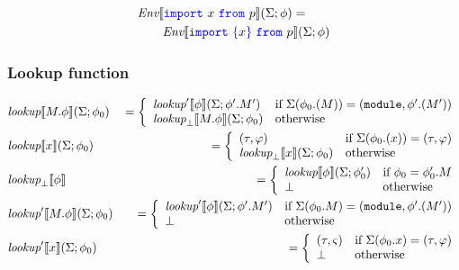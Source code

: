 \documentclass[a4paper]{article}
\newcommand{\code}[1]{\textcolor{blue}{\tt #1}}
\newcommand{\module}{{\tt{module}}}
\newcommand{\Env}{\emph{Env}}
\newcommand{\lookup}{\emph{lookup}}
\newcommand{\If}{\mbox{if}}
\newcommand{\Otherwise}{\mbox{otherwise}}
\begin{document}
\begin{equation*}
\begin{split}
&\Env \llbracket \code{import}\ x\ \code{from}\ p \rrbracket (\Sigma; \phi) = \\
&\qquad \Env \llbracket \code{import}\ \code{\{} x \code{\}}\ \code{from}\ p \rrbracket (\Sigma; \phi)
\end{split}
\end{equation*}

\subsubsection{Lookup function}

\begin{eqnarray*}
&\lookup \llbracket M.\phi \rrbracket (\Sigma; \phi_0) & = \left\{\begin{array}{ll}
\lookup' \llbracket \phi \rrbracket (\Sigma; \phi'.M') & \If\ \Sigma(\phi_0.(M)) = (\module, \phi'.(M')) \\
\lookup_\bot \llbracket M.\phi \rrbracket (\Sigma; \phi_0) & \Otherwise
\end{array}\right. \\
&\lookup \llbracket x \rrbracket (\Sigma; \phi_0) & = \left\{\begin{array}{ll}
(\tau, \varphi) & \If\ \Sigma(\phi_0.(x)) = (\tau, \varphi) \\
\lookup_\bot \llbracket x \rrbracket (\Sigma; \phi_0) & \Otherwise
\end{array}\right. \\
&\lookup_\bot \llbracket \phi \rrbracket & = \left\{\begin{array}{ll}
\lookup \llbracket \phi \rrbracket (\Sigma; \phi'_0) & \If\ \phi_0 = \phi'_0.M \\
\bot & \Otherwise
\end{array}\right. \\
&\lookup' \llbracket M.\phi \rrbracket (\Sigma; \phi_0) & = \left\{\begin{array}{ll}
\lookup' \llbracket \phi \rrbracket (\Sigma; \phi'.M') & \If\ \Sigma(\phi_0.M) = (\module, \phi'.(M')) \\
\bot & \Otherwise
\end{array}\right. \\
&\lookup' \llbracket x \rrbracket (\Sigma; \phi_0) & = \left\{\begin{array}{ll}
(\tau, \varsigma) & \If\ \Sigma(\phi_0.x) = (\tau, \varphi) \\
\bot & \Otherwise
\end{array}\right. \\
\end{eqnarray*}
\end{document}
